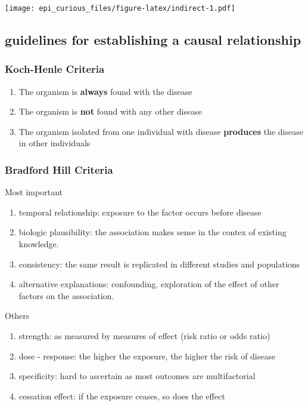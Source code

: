\documentclass[
]{article}
\begin{document}
\texttt{[image: epi\_curious\_files/figure-latex/indirect-1.pdf]}

\hypertarget{guidelines-for-establishing-a-causal-relationship}{%
\subsection{guidelines for establishing a causal
relationship}\label{guidelines-for-establishing-a-causal-relationship}}

\hypertarget{koch-henle-criteria}{%
\subsubsection{Koch-Henle Criteria}\label{koch-henle-criteria}}

\begin{enumerate}
\def\labelenumi{\arabic{enumi}.}
\item
  The organism is \textbf{always} found with the disease
\item
  The organism is \textbf{not} found with any other disease
\item
  The organism isolated from one individual with disease
  \textbf{produces} the disease in other individuals
\end{enumerate}

\hypertarget{bradford-hill-criteria}{%
\subsubsection{Bradford Hill Criteria}\label{bradford-hill-criteria}}

Most important

\begin{enumerate}
\def\labelenumi{\arabic{enumi}.}
\item
  temporal relationship: exposure to the factor occurs before disease
\item
  biologic plausibility: the association makes sense in the contex of
  existing knowledge.
\item
  consistency: the same result is replicated in different studies and
  populations
\item
  alternative explanations: confounding. exploration of the effect of
  other factors on the association.
\end{enumerate}

Others

\begin{enumerate}
\def\labelenumi{\arabic{enumi}.}
\setcounter{enumi}{4}
\item
  strength: as measured by measures of effect (risk ratio or odds ratio)
\item
  dose - response: the higher the exposure, the higher the risk of
  disease
\item
  specificity: hard to ascertain as most outcomes are multifactorial
\item
  cessation effect: if the exposure ceases, so does the effect
\end{enumerate}
\end{document}
